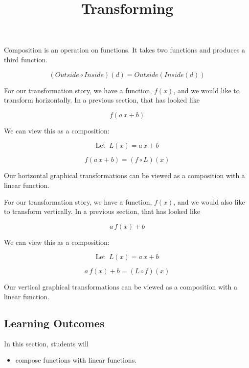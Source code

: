 \documentclass{ximera}
\title{Transforming}
\begin{document}
\begin{abstract}
\end{abstract}
\maketitle






Composition is an operation on functions.  It takes two functions and produces a third function.


\[  (Outside \circ Inside)(d) = Outside(Inside(d))    \]


For our transformation story, we have a function, $f(x)$, and we would like to transform horizontally.  In a previous section, that has looked like


\[   f(a \, x + b)  \]


We can view this as a composition:


\[  \text{Let } \, L(x) = a \, x + b   \]


\[   f(a \, x + b)  = (f \circ L)(x)\]



Our horizontal graphical transformations can be viewed as a composition with a linear function.





For our transformation story, we have a function, $f(x)$, and we would also like to transform vertically.  In a previous section, that has looked like


\[   a \, f(x) + b  \]


We can view this as a composition:


\[  \text{Let } \, L(x) = a \, x + b   \]


\[   a \, f(x) + b  = (L \circ f)(x)\]



Our vertical graphical transformations can be viewed as a composition with a linear function.









\subsection*{Learning Outcomes}


\begin{sectionOutcomes}
In this section, students will 

\begin{itemize}
\item compose functions with linear functions.
\end{itemize}
\end{sectionOutcomes}
\end{document}
